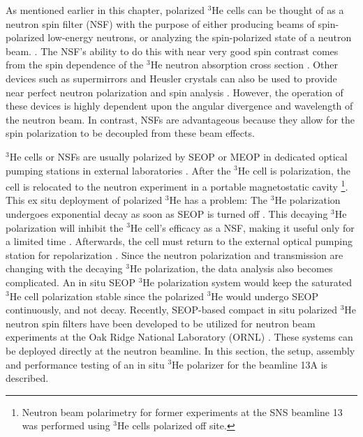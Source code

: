 As mentioned earlier in this chapter, polarized $^3$He cells can be thought of as a neutron spin filter (NSF) with the purpose of either producing beams of spin-polarized low-energy neutrons, or analyzing the spin-polarized state of a neutron beam. \cite{Ioffe2011}. The NSF’s ability to do this with near very good spin contrast comes from the spin dependence of the $^3$He neutron absorption cross section \cite{Coulter1990, Passell1966}. Other devices such as supermirrors \cite{Mezei1976} and Heusler crystals can also be used to provide near perfect neutron polarization and spin analysis \cite{Williams1988}. However, the operation of these devices is highly dependent upon the angular divergence and wavelength of the neutron beam. In contrast, NSFs are advantageous because they allow for the spin polarization to be decoupled from these beam effects. 


$^3$He cells or NSFs are usually polarized by SEOP or MEOP in dedicated optical pumping stations in external laboratories \cite{Jiang2023}. After the $^3$He cell is polarization, the cell is relocated to the neutron experiment in a portable magnetostatic cavity \footnote{Neutron beam polarimetry for former experiments at the SNS beamline 13 was performed using $^3$He cells polarized off site.}. This ex situ deployment of polarized $^3$He has a problem: The $^3$He polarization undergoes exponential decay as soon as SEOP is turned off \cite{Jiang2023}. This decaying $^3$He polarization will inhibit the $^3$He cell's efficacy as a NSF, making it useful only for a limited time \cite{Jiang2017, Jiang2023}. Afterwards, the cell must return to the external optical pumping station for repolarization \cite{Jiang2017, Jiang2023}. Since the neutron polarization and transmission are changing with the decaying $^3$He polarization, the data analysis also becomes complicated. An in situ SEOP $^3$He polarization system would keep the saturated $^3$He cell polarization stable since the polarized $^3$He would undergo SEOP continuously, and not decay. Recently, SEOP-based compact in situ polarized $^3$He neutron spin filters have been developed to be utilized for neutron beam experiments at the Oak Ridge National Laboratory (ORNL) \cite{Tong2012, Jiang2014, Jiang2017, Jiang2023}. These systems can be deployed directly at the neutron beamline. In this section, the setup, assembly and performance testing of an in situ $^3$He polarizer for the beamline 13A is described.

